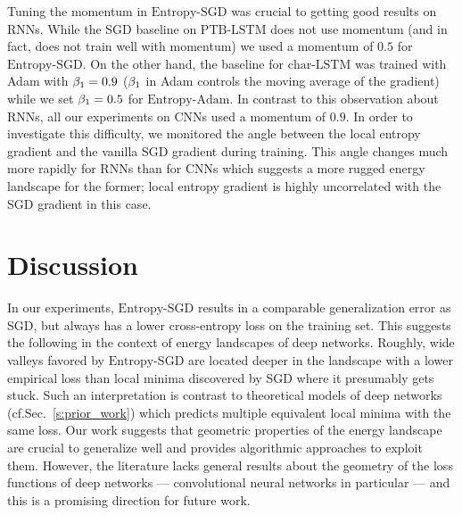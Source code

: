 \documentclass[10pt]{article}
\newcommand{\entropysgd}{\mathrm{Entropy}\textrm{-}\mathrm{SGD}}
\newcommand{\entropyadam}{\mathrm{Entropy}\textrm{-}\mathrm{Adam}}
\newcommand{\charlstm}{\textrm{char-LSTM}}
\newcommand{\ptblstm}{\textrm{PTB-LSTM}}
\begin{document}

Tuning the momentum in $\entropysgd$ was crucial to getting good results on RNNs. While the SGD baseline on $\ptblstm$ does not use momentum (and in fact, does not train well with momentum) we used a momentum of $0.5$ for $\entropysgd$. On the other hand, the baseline for $\charlstm$ was trained with Adam with $\beta_1 = 0.9$ ($\beta_1$ in Adam controls the moving average of the gradient) while we set $\beta_1 = 0.5$ for $\entropyadam$. In contrast to this observation about RNNs, all our experiments on CNNs used a momentum of $0.9$. In order to investigate this difficulty, we monitored the angle between the local entropy gradient and the vanilla SGD gradient during training. This angle changes much more rapidly for RNNs than for CNNs which suggests a more rugged energy landscape for the former; local entropy gradient is highly uncorrelated with the SGD gradient in this case.

\section{Discussion}
\label{s:discussion}

In our experiments, $\entropysgd$ results in a comparable generalization error as SGD, but always has a lower cross-entropy loss on the training set. This suggests the following in the context of energy landscapes of deep networks. Roughly, wide valleys favored by $\entropysgd$ are located deeper in the landscape with a lower empirical loss than local minima discovered by SGD where it presumably gets stuck. Such an interpretation is contrast to theoretical models of deep networks (cf.\@ Sec.~\ref{s:prior_work}) which predicts multiple equivalent local minima with the same loss. Our work suggests that geometric properties of the energy landscape are crucial to generalize well and provides algorithmic approaches to exploit them. However, the literature lacks general results about the geometry of the loss functions of deep networks --- convolutional neural networks in particular --- and this is a promising direction for future work.
\end{document}
